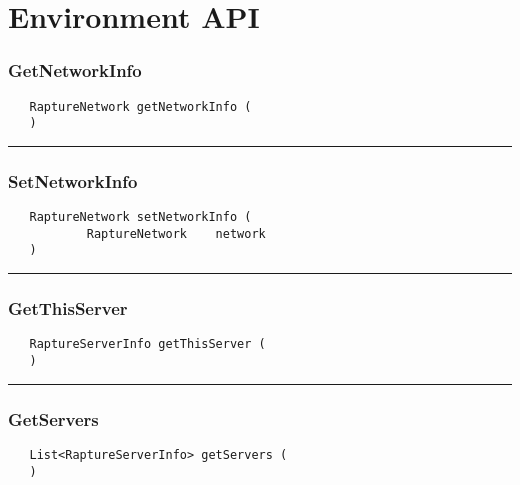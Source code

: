 \chapter{Environment API}

\subsection{GetNetworkInfo}
\label{Api:GetNetworkInfo}
\begin{verbatim}
   RaptureNetwork getNetworkInfo (
   )
\end{verbatim}



\rule{15cm}{2pt}
\subsection{SetNetworkInfo}
\label{Api:SetNetworkInfo}
\begin{verbatim}
   RaptureNetwork setNetworkInfo (
           RaptureNetwork    network
   )
\end{verbatim}



\rule{15cm}{2pt}
\subsection{GetThisServer}
\label{Api:GetThisServer}
\begin{verbatim}
   RaptureServerInfo getThisServer (
   )
\end{verbatim}



\rule{15cm}{2pt}
\subsection{GetServers}
\label{Api:GetServers}
\begin{verbatim}
   List<RaptureServerInfo> getServers (
   )
\end{verbatim}



